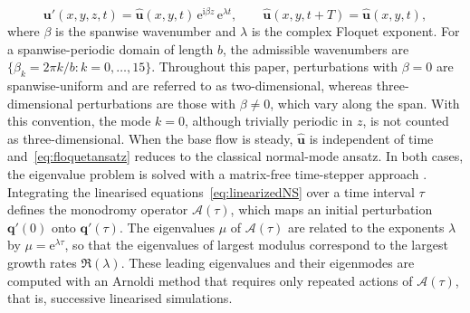 \documentclass[lineno]{jfm}
\begin{document}
\begin{equation}\label{eq:floquetansatz}
	\boldsymbol{u}'(x,y,z,t)
	= \hat{\boldsymbol{u}}(x,y,t)\,\mathrm{e}^{\mathrm{i}\beta z}\,\mathrm{e}^{\lambda t},
	\qquad
	\hat{\boldsymbol{u}}(x,y,t+T)=\hat{\boldsymbol{u}}(x,y,t),
\end{equation}
where $\beta$ is the spanwise wavenumber and $\lambda$ is the complex Floquet exponent. For a spanwise-periodic domain of length $b$, the admissible wavenumbers are $\{\beta_k = 2\pi k/b : k=0,\ldots,15\}$. Throughout this paper, perturbations with $\beta=0$ are spanwise-uniform and are referred to as two-dimensional, whereas three-dimensional perturbations are those with $\beta\neq0$, which vary along the span. With this convention, the mode $k=0$, although trivially periodic in $z$, is not counted as three-dimensional. When the base flow is steady, $\hat{\boldsymbol{u}}$ is independent of time and~\eqref{eq:floquetansatz} reduces to the classical normal-mode ansatz. In both cases, the eigenvalue problem is solved with a matrix-free time-stepper approach \citep{tuckermanBarkley2000,barkleyBlackburnSherwin2008}. Integrating the linearised equations~\eqref{eq:linearizedNS} over a time interval $\tau$ defines the monodromy operator $\mathcal{A}(\tau)$, which maps an initial perturbation $\boldsymbol{q}'(0)$ onto $\boldsymbol{q}'(\tau)$. The eigenvalues $\mu$ of $\mathcal{A}(\tau)$ are related to the exponents $\lambda$ by $\mu=\mathrm{e}^{\lambda\tau}$, so that the eigenvalues of largest modulus correspond to the largest growth rates $\Re(\lambda)$. These leading eigenvalues and their eigenmodes are computed with an Arnoldi method that requires only repeated actions of $\mathcal{A}(\tau)$, that is, successive linearised simulations.
\end{document}
